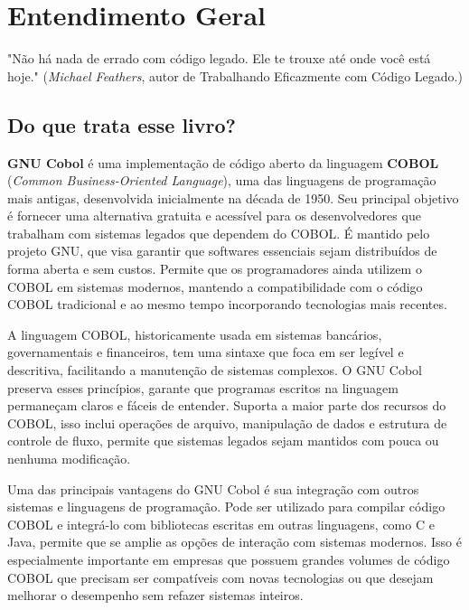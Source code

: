 \chapter{Entendimento Geral}

\begin{remark}
"Não há nada de errado com código legado. Ele te trouxe até onde você está hoje." (\textit{Michael Feathers}, autor de Trabalhando Eficazmente com Código Legado.) 
\end{remark}

\section{Do que trata esse livro?}
\textbf{GNU Cobol} é uma implementação de código aberto da linguagem \textbf{COBOL} (\textit{Common Business-Oriented Language}), uma das linguagens de programação mais antigas, desenvolvida inicialmente na década de 1950. Seu principal objetivo é fornecer uma alternativa gratuita e acessível para os desenvolvedores que trabalham com sistemas legados que dependem do COBOL. É mantido pelo projeto GNU, que visa garantir que softwares essenciais sejam distribuídos de forma aberta e sem custos. Permite que os programadores ainda utilizem o COBOL em sistemas modernos, mantendo a compatibilidade com o código COBOL tradicional e ao mesmo tempo incorporando tecnologias mais recentes.

A linguagem COBOL, historicamente usada em sistemas bancários, governamentais e financeiros, tem uma sintaxe que foca em ser legível e descritiva, facilitando a manutenção de sistemas complexos. O GNU Cobol preserva esses princípios, garante que programas escritos na linguagem permaneçam claros e fáceis de entender. Suporta a maior parte dos recursos do COBOL, isso inclui operações de arquivo, manipulação de dados e estrutura de controle de fluxo, permite que sistemas legados sejam mantidos com pouca ou nenhuma modificação.

Uma das principais vantagens do GNU Cobol é sua integração com outros sistemas e linguagens de programação. Pode ser utilizado para compilar código COBOL e integrá-lo com bibliotecas escritas em outras linguagens, como C e Java, permite que se amplie as opções de interação com sistemas modernos. Isso é especialmente importante em empresas que possuem grandes volumes de código COBOL que precisam ser compatíveis com novas tecnologias ou que desejam melhorar o desempenho sem refazer sistemas inteiros.


